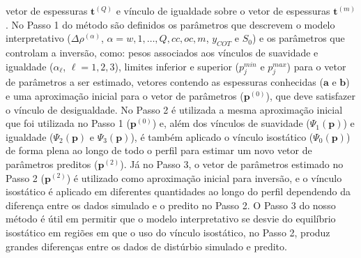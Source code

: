 vetor de espessuras $\mathbf{t}^{(Q)}$ e vínculo de igualdade sobre o vetor de espessuras $\mathbf{t}^{(m)}$. No Passo 1 do método são definidos os parâmetros que descrevem o modelo interpretativo ($\Delta \rho^{(\alpha)}$, $\alpha = w, 1, \dots, Q, cc, oc, m$, $y_{COT}$ e $S_{0}$) e os parâmetros que controlam a inversão, como: pesos associados aos vínculos de suavidade e igualdade ($\alpha_{\ell}$, $\ell = 1, 2, 3$), limites inferior e superior ($p^{min}_{j}$ e $p^{max}_{j}$) para o vetor de parâmetros a ser estimado, vetores contendo as espessuras conhecidas ($\mathbf{a}$ e $\mathbf{b}$) e uma aproximação inicial para o vetor de parâmetros ($\mathbf{p}^{(0)}$), que deve satisfazer o vínculo de desigualdade. No Passo 2 é utilizada a mesma aproximação inicial que foi utilizada no Passo 1 ($\mathbf{p}^{(0)}$) e, além dos vínculos de suavidade ($\Psi_{1}(\mathbf{p})$) e igualdade ($\Psi_{2}(\mathbf{p})$ e $\Psi_{3}(\mathbf{p})$), é também aplicado o vínculo isostático ($\Psi_{0}(\mathbf{p})$) de forma plena ao longo de todo o perfil para estimar um novo vetor de parâmetros preditos ($\mathbf{p}^{(2)}$). Já no Passo 3, o vetor de parâmetros estimado no Passo 2 ($\mathbf{p}^{(2)}$) é utilizado como aproximação inicial para inversão, e o vínculo isostático é aplicado em diferentes quantidades ao longo do perfil dependendo da diferença entre os dados simulado e o predito no Passo 2. O Passo 3 do nosso método é útil em permitir que o modelo interpretativo se desvie do equilíbrio isostático em regiões em que o uso do vínculo isostático, no Passo 2, produz grandes diferenças entre os dados de distúrbio simulado e predito.

